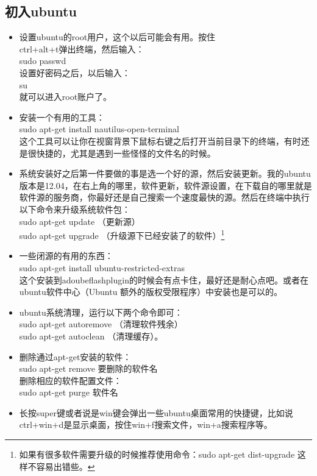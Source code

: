 \documentclass[11pt,oneside]{book}
\begin{document}
\begin{common-format}
\section{初入ubuntu}
\begin{itemize}
\item 设置ubuntu的root用户，这个以后可能会有用。按住\\
ctrl+alt+t弹出终端，然后输入：\\ sudo passwd \\设置好密码之后，以后输入：\\ su\\就可以进入root账户了。
\item 安装一个有用的工具：\\sudo apt-get install nautilus-open-terminal\\这个工具可以让你在视窗背景下鼠标右键之后打开当前目录下的终端，有时还是很快捷的，尤其是遇到一些怪怪的文件名的时候。
\item 系统安装好之后第一件要做的事是选一个好的源，然后安装更新。我的ubuntu版本是12.04，在右上角的哪里，软件更新，软件源设置，在下载自的哪里就是软件源的服务商，你最好还是自己搜索一个速度最快的源。然后在终端中执行以下命令来升级系统软件包：\\sudo apt-get update  （更新源）\\sudo apt-get upgrade   （升级源下已经安装了的软件）\footnote{如果有很多软件需要升级的时候推荐使用命令：sudo apt-get dist-upgrade 这样不容易出错些。}
\item 一些闭源的有用的东西：\\sudo apt-get install ubuntu-restricted-extras\\这个安装到adoubeflashplugin的时候会有点卡住，最好还是耐心点吧。或者在ubuntu软件中心（Ubuntu 额外的版权受限程序）中安装也是可以的。
\item ubuntu系统清理，运行以下两个命令即可：\\sudo apt-get autoremove （清理软件残余）\\sudo apt-get autoclean  （清理缓存）。
\item 删除通过apt-get安装的软件：\\sudo apt-get remove 要删除的软件名\\删除相应的软件配置文件：\\sudo apt-get purge 软件名
\item 长按super键或者说是win键会弹出一些ubuntu桌面常用的快捷键，比如说ctrl+win+d是显示桌面，按住win+f搜索文件，win+a搜索程序等。
\end{itemize}


\end{common-format}
\end{document}

